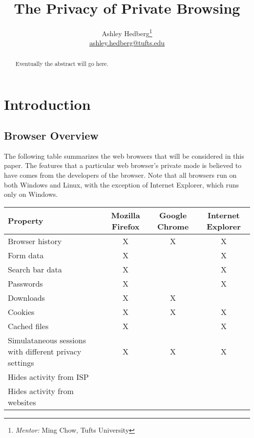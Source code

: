 \documentclass[pdftex,letterpaper,titlepage,11pt]{article}
\begin{document}
  \title{The Privacy of Private Browsing}
  \author{Ashley Hedberg\thanks{\emph{Mentor:} Ming Chow, Tufts University} \\
  \href{mailto:ashley.hedberg@tufts.edu}{ashley.hedberg@tufts.edu}}
  \date{}
  \maketitle
  
  \begin{abstract}
  Eventually the abstract will go here.
  \end{abstract}

  \section{Introduction}
    \subsection{Browser Overview}
    The following table summarizes the web browsers that will be considered in
    this paper. The features that a particular web browser's private mode is
    believed to have comes from the developers of the browser. Note that all
    browsers run on both Windows and Linux, with the exception of Internet
    Explorer, which runs only on Windows.\cite{verdi13}\cite{google13}
    \cite{ie13}

    \begin{center}
      \begin{tabular}{|m{}|c|c|c|}
        \hline
        Property & Mozilla Firefox & Google Chrome & Internet Explorer \\
        \hline
        Browser history & X & X & X \\
        \hline
        Form data & X &  & X \\
        \hline
        Search bar data & X &  & X \\
        \hline
        Passwords & X &  & X \\
        \hline
        Downloads & X & X &  \\
        \hline
        Cookies & X & X & X \\
        \hline
        Cached files & X &  & X \\
        \hline
        Simulataneous sessions with different privacy settings & X & X & X \\
        \hline
        Hides activity from ISP &  &  &  \\
        \hline
        Hides activity from websites &  &  &  \\
        \hline
      \end{tabular}
    \end{center}
\end{document}
